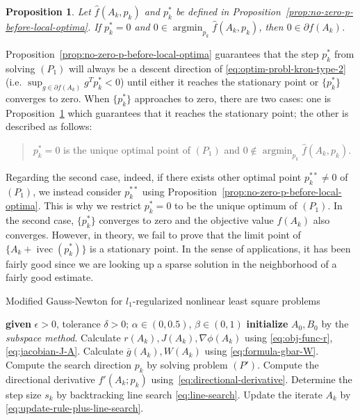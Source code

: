 \documentclass[letterpaper,10pt,journal,final]{IEEEtran}
\newtheorem{proposition}[theorem]{Proposition}
\theoremstyle{definition}
\theoremstyle{remark}
\newcommand{\ikvec}{\operatorname{ivec}}
\begin{document}
\begin{proposition}
  \label{prop:zero-p-guarantee-local-optima}
  Let $\hat{f}(A_k, p_k)$ and $p_k^*$ be defined in
  Proposition~\ref{prop:no-zero-p-before-local-optima}.
  If $p_k^* = 0$ and $0 \in \operatorname{argmin}_{p_k} \hat{f}(A_k,p_k)$, then
  $0 \in \partial f(A_k)$.
\end{proposition}

Proposition~\ref{prop:no-zero-p-before-local-optima} guarantees that the step $p_k^*$
from solving $(P_1)$ will always be a descent direction of
\eqref{eq:optim-probl-kron-type-2} (i.e. $\sup_{g\in \partial f(A_k)} g^T p_k^* < 0$)
until either it reaches the stationary point or $\{p_k^*\}$ converges to zero. When
$\{p_k^*\}$ approaches to zero, there are two cases: one is
Proposition~\ref{prop:zero-p-guarantee-local-optima} which guarantees that it reaches
the stationary point; the other is described as follows:
\begin{quote}
  $p_k^* = 0$ is the unique optimal point of $(P_1)$ and $0 \notin \operatorname{argmin}_{p_k} \hat{f}(A_k,p_k)$.
\end{quote}
Regarding the second case, indeed, if there exists other optimal point
$p_k^{**} \neq 0$ of $(P_1)$, we instead consider $p_k^{**}$ using
Proposition~\ref{prop:no-zero-p-before-local-optima}. This is why we restrict
$p_k^* =0$ to be the unique optimum of $(P_1)$. In the second case, $\{p_k^*\}$
converges to zero and the objective value $f(A_k)$ also converges. However, in
theory, we fail to prove that the limit point of $\{A_k+ \ikvec(p_k^*)\}$ is a
stationary point. In the sense of applications, it has been fairly good since we are
looking up a sparse solution in the neighborhood of a fairly good estimate.

\begin{algorithm}
  \caption{\small Modified Gauss-Newton for $l_1$-regularized nonlinear least square problems}
  \label{alg:iter-algor-optimisation}
  \small
  \begin{algorithmic}[1]
    \State \textbf{given} $\epsilon >0$, tolerance $\delta > 0$; $\alpha \in (0,0.5)$, $\beta \in (0,1)$
    \State \textbf{initialize} $A_0,B_0$ by the \emph{subspace method}.
    \Repeat
    \State Calculate \(r(A_{k}), J(A_{k}), \nabla \phi(A_{k})\) using \eqref{eq:obj-func-r}, \eqref{eq:jacobian-J-A}.
    \State Calculate \(\bar{g}(A_k), W(A_k)\) using \eqref{eq:formula-gbar-W}.
    \State Compute the search direction \(p_k\) by solving problem \((P')\).
    \State Compute the directional derivative \(f'(A_k; p_k)\) using~\eqref{eq:directional-derivative}.
    \State Determine the step size \(s_k\) by backtracking line search \eqref{eq:line-search}.
    \State Update the iterate \(A_{k}\) by \eqref{eq:update-rule-plus-line-search}.
      \end{algorithmic}
\end{algorithm}
\end{document}
